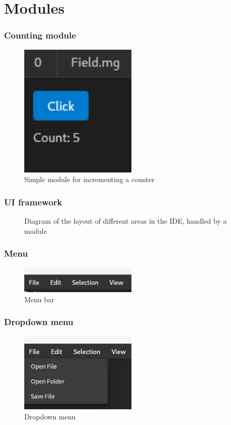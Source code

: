 \section{Modules}
\SectionPage

\begin{frame}
  \frametitle{Counting module}
  \begin{figure}[H]
    \centering
    \includegraphics[width=0.5\textwidth]{./pics/module-counter.png}
    \caption{
      Simple module for incrementing a counter
    }
  \end{figure}
\end{frame}

\begin{frame}
  \frametitle{UI framework}
  \begin{figure}[H]
    \centering
    
    \caption{
      Diagram of the layout of different areas in the IDE, handled by a module
    }
  \end{figure}
\end{frame}

\begin{frame}
  \frametitle{Menu}
  \begin{figure}
    \centering
    \includegraphics[width=0.5\textwidth]{./pics/menu-bar.png}
    \caption{
      Menu bar
    }
  \end{figure}
\end{frame}

\begin{frame}
  \frametitle{Dropdown menu}
  \begin{figure}
    \centering
    \includegraphics[width=0.5\textwidth]{./pics/menu-dropdown.png}
    \caption{
      Dropdown menu
    }
  \end{figure}
\end{frame}

